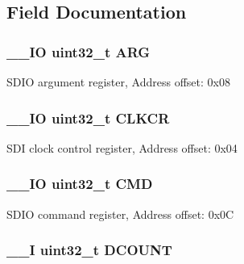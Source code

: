 \subsection{Field Documentation}
\hypertarget{struct_s_d_i_o___type_def_a07d4e63efcbde252c667e64a8d818aa9}{
\subsubsection[{A\-R\-G}]{\setlength{\rightskip}{0pt plus 5cm}\-\_\-\-\_\-\-I\-O uint32\-\_\-t A\-R\-G}}\label{struct_s_d_i_o___type_def_a07d4e63efcbde252c667e64a8d818aa9}
S\-D\-I\-O argument register, Address offset\-: 0x08 \hypertarget{struct_s_d_i_o___type_def_aa94197378e20fc739d269be49d9c5d40}{
\subsubsection[{C\-L\-K\-C\-R}]{\setlength{\rightskip}{0pt plus 5cm}\-\_\-\-\_\-\-I\-O uint32\-\_\-t C\-L\-K\-C\-R}}\label{struct_s_d_i_o___type_def_aa94197378e20fc739d269be49d9c5d40}
S\-D\-I clock control register, Address offset\-: 0x04 \hypertarget{struct_s_d_i_o___type_def_adcf812cbe5147d300507d59d4a55935d}{
\subsubsection[{C\-M\-D}]{\setlength{\rightskip}{0pt plus 5cm}\-\_\-\-\_\-\-I\-O uint32\-\_\-t C\-M\-D}}\label{struct_s_d_i_o___type_def_adcf812cbe5147d300507d59d4a55935d}
S\-D\-I\-O command register, Address offset\-: 0x0\-C \hypertarget{struct_s_d_i_o___type_def_a4273e2b5aeb7bdf1006909b1a2b59bc8}{
\subsubsection[{D\-C\-O\-U\-N\-T}]{\setlength{\rightskip}{0pt plus 5cm}\-\_\-\-\_\-\-I uint32\-\_\-t D\-C\-O\-U\-N\-T}}\label{struct_s_d_i_o___type_def_a4273e2b5aeb7bdf1006909b1a2b59bc8}
